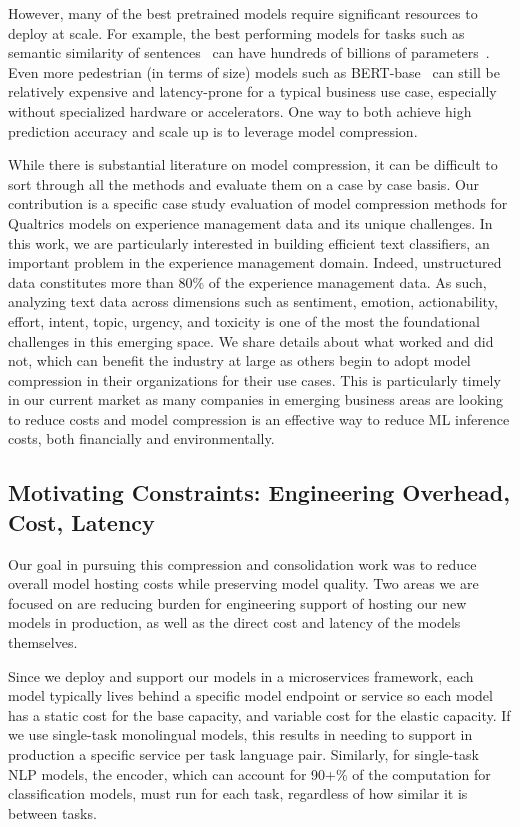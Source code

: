 \documentclass[letterpaper]{article} %
\begin{document}
However, many of the best pretrained models require significant resources to deploy at scale. 
For example, the best performing models for tasks such as semantic similarity of sentences~\cite{wang2018glue} can have hundreds of billions of parameters~\cite{smith2022using}.
Even more pedestrian (in terms of size) models such as BERT-base~\cite{devlin-etal-2019-bert} can still be relatively expensive and latency-prone for a typical business use case, especially without specialized hardware or accelerators.
One way to both achieve high prediction accuracy and scale up is to leverage model compression.

While there is substantial literature on model compression, it can be difficult to sort through all the methods and evaluate them on a case by case basis.
Our contribution is a specific case study evaluation of model compression methods for Qualtrics models on experience management data and its unique challenges.
In this work, we are particularly interested in building efficient text classifiers, an important problem in the experience management domain. 
Indeed, unstructured data constitutes more than 80\% of the experience management data.
As such, analyzing text data across dimensions such as sentiment, emotion, actionability, effort, intent, topic, urgency, and toxicity is one of the most the foundational challenges in this emerging space. 
We share details about what worked and did not, which can benefit the industry at large as others begin to adopt model compression in their organizations for their use cases.
This is particularly timely in our current market as many companies in emerging business areas are looking to reduce costs and model compression is an effective way to reduce ML inference costs, both financially and environmentally.

\subsection*{Motivating Constraints: Engineering Overhead, Cost, Latency}
Our goal in pursuing this compression and consolidation work was to reduce overall model hosting costs while preserving model quality.
Two areas we are focused on are reducing burden for engineering support of hosting our new models in production, as well as the direct cost and latency of the models themselves.

Since we deploy and support our models in a microservices framework, each model typically lives behind a specific model endpoint or service so each model has a static cost for the base capacity, and variable cost for the elastic capacity.
If we use single-task monolingual models, this results in needing to support in production a specific service per task language pair.
Similarly, for single-task NLP models, the encoder, which can account for 90+\% of the computation for classification models, must run for each task, regardless of how similar it is between tasks.
\end{document}
